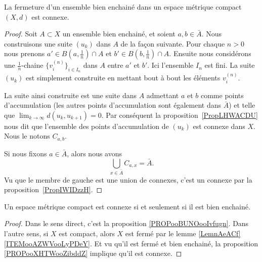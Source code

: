 \begin{proposition}     \label{PROPooXHTWooZibddZ}
	La fermeture d'un ensemble bien enchainé dans un espace métrique compact \( (X,d)\) est connexe.
\end{proposition}

\begin{proof}
	Soit \( A\subset X\) un ensemble bien enchainé, et soient \( a,b\in \bar A\). Nous construisons une suite \( (u_k)\) dans \( A\) de la façon suivante. Pour chaque \( n>0\) nous prenons \( a'\in B(a,\frac{1}{ n })\cap A\) et \( b'\in B(b,\frac{1}{ n })\cap A\). Ensuite nous considérons une \( \frac{1}{ n }\)-chaine \( \{ v_i^{(n)} \}_{i\in I_n}\) dans \( A\) entre \( a'\) et \( b'\). Ici l'ensemble \( I_n\) est fini. La suite \( (u_k)\) est simplement construite en mettant bout à bout les éléments \( v_i^{(n)}\).

	La suite ainsi construite est une suite dans \( A\) admettant \( a\) et \( b\) comme points d'accumulation (les autres points d'accumulation sont également dans \( \bar A\)) et telle que \( \lim_{k\to \infty} d(u_k,u_{k+1})=0\). Par conséquent la proposition~\ref{PropLHWACDU} nous dit que l'ensemble des points d'accumulation de \( (u_k)\) est connexe dans \( X\). Nous le notons \( C_{a,b}\).

	Si nous fixons \( a\in \bar A\), alors nous avons
	\begin{equation}
		\bigcup_{x\in \bar A}C_{a,x}=\bar A.
	\end{equation}
	Vu que le membre de gauche est une union de connexes, c'est un connexe par la proposition~\ref{PropIWIDzzH}.
\end{proof}

\begin{corollary}       \label{CORooSIKCooTncoQm}
	Un espace métrique compact est connexe si et seulement si il est bien enchainé.
\end{corollary}

\begin{proof}
	Dans le sens direct, c'est la proposition \ref{PROPooBUNOooIvfugn}. Dans l'autre sens, si \( X\) est compact, alors \( X\) est fermé par le lemme \ref{LemnAeACf}\ref{ITEMooAZWVooLyPDeY}. Et vu qu'il est fermé et bien enchainé, la proposition \ref{PROPooXHTWooZibddZ} implique qu'il est connexe.
\end{proof}

